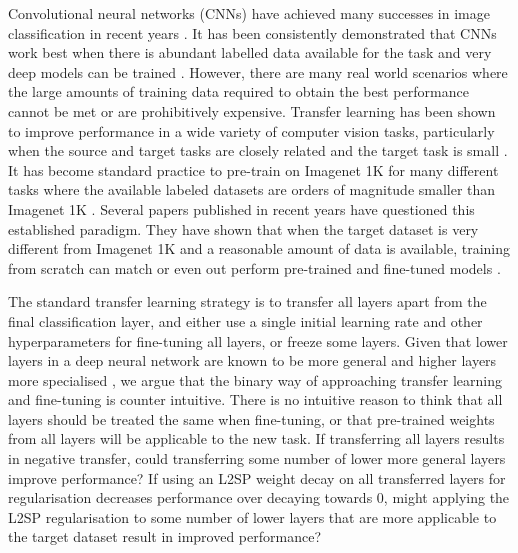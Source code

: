 \documentclass[]{article}
\begin{document}
Convolutional neural networks (CNNs) have achieved many successes
in image classification in recent years \cite{krizhevsky2012imagenet,girshick2014rich,li2020deep,masi2018deep,mazurowski2019deep}.
It has been consistently demonstrated that CNNs work best when there
is abundant labelled data available for the task and very deep models
can be trained \cite{ngiam2018domain,mahajan2018exploring,kolesnikov2019big}.
However, there are many real world scenarios where the large amounts
of training data required to obtain the best performance cannot be
met or are prohibitively expensive. Transfer learning has been shown
to improve performance in a wide variety of computer vision tasks,
particularly when the source and target tasks are closely related
and the target task is small \cite{ngiam2018domain,mahajan2018exploring,cui2018large,ge2017borrowing,sabatelli2018deep,ng2015deep,li2018explicit,li2019delta,wan2019towards}. It has become
standard practice to pre-train on Imagenet 1K for many different tasks
where the available labeled datasets are orders of magnitude smaller
than Imagenet 1K \cite{li2018explicit,li2019delta,wan2019towards,masi2018deep,li2020deep,ng2015deep,mazurowski2019deep,mormont2018comparison,girshick2014rich}. Several papers published in
recent years have questioned this established paradigm. They have
shown that when the target dataset is very different from Imagenet
1K and a reasonable amount of data is available, training from scratch
can match or even out perform pre-trained and fine-tuned models \cite{he2018rethinking,shen2017learning,shen2017dsod,zhu2019scratchdet,mahajan2018exploring}.

The standard
transfer learning strategy is to transfer all layers apart from the
final classification layer, and either use a single initial learning rate and other hyperparameters for fine-tuning all layers, or freeze some layers. Given that lower layers in a deep neural network are known to be more
general and higher layers more specialised \cite{yosinski2014transferable},
we argue that the binary way of approaching transfer learning and
fine-tuning is counter intuitive. There is no intuitive reason to
think that all layers should be treated the same when fine-tuning,
or that pre-trained weights from all layers will be applicable to
the new task. If transferring all layers results in negative transfer,
could transferring some number of lower more general layers improve
performance? If using an L2SP weight decay on all transferred layers
for regularisation decreases performance over decaying towards 0,
might applying the L2SP regularisation to some number of lower layers
that are more applicable to the target dataset result in improved
performance? 
\end{document}
